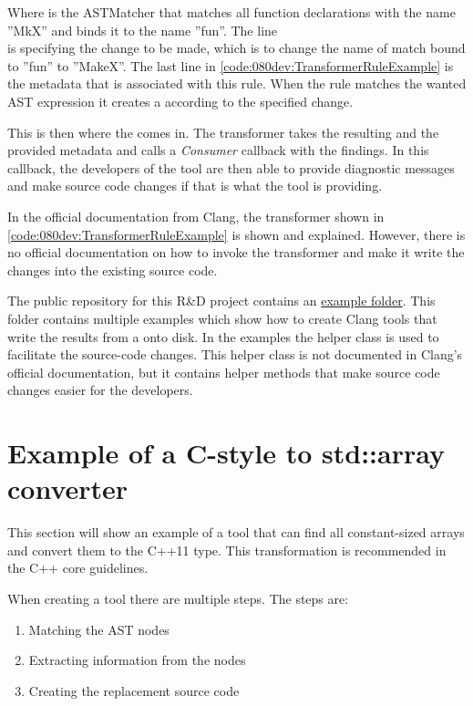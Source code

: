 Where  is the ASTMatcher that matches all function declarations with the name ''MkX'' and binds it to the name ''fun''. The line \\ is specifying the change to be made, which is to change the name of match bound to ''fun'' to ''MakeX''. The last line in \cref{code:080dev:TransformerRuleExample} is the metadata that is associated with this rule. When the rule matches the wanted AST expression it creates a  according to the specified change. 

This is then where the  comes in. The transformer takes the resulting  and the provided metadata and calls a \textit{Consumer} callback with the findings. In this callback, the developers of the tool are then able to provide diagnostic messages and make source code changes if that is what the tool is providing.\cite{ClangTransformerTutorial}

In the official documentation from Clang, the transformer shown in \cref{code:080dev:TransformerRuleExample} is shown and explained. However, there is no official documentation on how to invoke the transformer and make it write the changes into the existing source code. 

The public repository for this R\&D project contains an \href{https://github.com/mortenhaahr/RD/tree/main/examples}{example folder}. This folder contains multiple examples which show how to create Clang tools that write the results from a  onto disk.\cite{kristensenMortenhaahrRD2023} In the examples the  helper class is used to facilitate the source-code changes. This helper class is not documented in Clang's official documentation, but it contains helper methods that make source code changes easier for the developers. 



\section{Example of a C-style to std::array converter}

This section will show an example of a tool that can find all constant-sized arrays and convert them to the C++11  type. This transformation is recommended in the C++ core guidelines.\cite{CoreGuidelines}

When creating a tool there are multiple steps. The steps are:
\begin{enumerate}
    \item Matching the AST nodes
    \item Extracting information from the nodes
    \item Creating the replacement source code
\end{enumerate}

